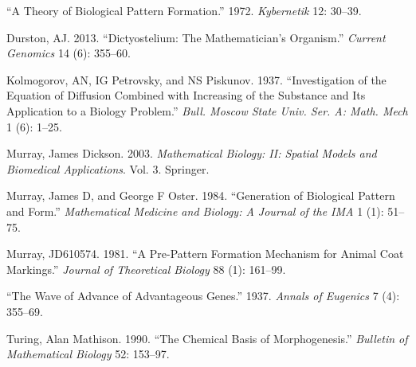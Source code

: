 \documentclass[
  letterpaper,
  DIV=11,
  numbers=noendperiod]{scrreprt}
\newlength{\cslhangindent}
\newlength{\cslentryspacingunit} %
\newenvironment{CSLReferences}[2] %
 {%
  \setlength{\parindent}{0pt}
  \ifodd #1
  \let\oldpar\par
  \def\par{\hangindent=\cslhangindent\oldpar}
  \fi
  \setlength{\parskip}{#2\cslentryspacingunit}
 }%
 {}
\theoremstyle{plain}
\theoremstyle{definition}
\theoremstyle{plain}
\theoremstyle{remark}
\begin{document}
\hypertarget{refs}{}
\begin{CSLReferences}{1}{0}
\leavevmode{}%
{``A Theory of Biological Pattern Formation.''} 1972. \emph{Kybernetik}
12: 30--39.

\leavevmode{}%
Durston, AJ. 2013. {``Dictyostelium: The Mathematician's Organism.''}
\emph{Current Genomics} 14 (6): 355--60.

\leavevmode{}%
Kolmogorov, AN, IG Petrovsky, and NS Piskunov. 1937. {``Investigation of
the Equation of Diffusion Combined with Increasing of the Substance and
Its Application to a Biology Problem.''} \emph{Bull. Moscow State Univ.
Ser. A: Math. Mech} 1 (6): 1--25.

\leavevmode{}%
Murray, James Dickson. 2003. \emph{Mathematical Biology: II: Spatial
Models and Biomedical Applications}. Vol. 3. Springer.

\leavevmode{}%
Murray, James D, and George F Oster. 1984. {``Generation of Biological
Pattern and Form.''} \emph{Mathematical Medicine and Biology: A Journal
of the IMA} 1 (1): 51--75.

\leavevmode{}%
Murray, JD610574. 1981. {``A Pre-Pattern Formation Mechanism for Animal
Coat Markings.''} \emph{Journal of Theoretical Biology} 88 (1): 161--99.

\leavevmode{}%
{``The Wave of Advance of Advantageous Genes.''} 1937. \emph{Annals of
Eugenics} 7 (4): 355--69.

\leavevmode{}%
Turing, Alan Mathison. 1990. {``The Chemical Basis of Morphogenesis.''}
\emph{Bulletin of Mathematical Biology} 52: 153--97.

\end{CSLReferences}
\end{document}
